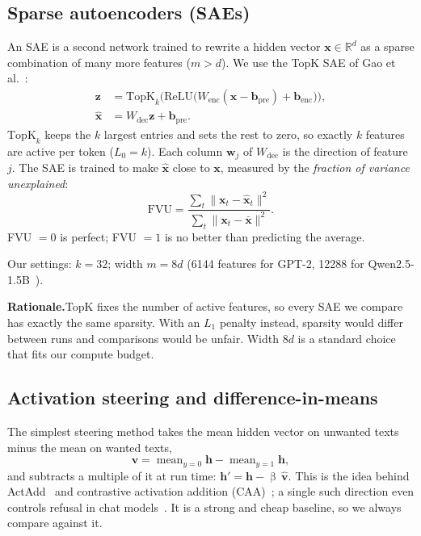 \documentclass[11pt,a4paper]{article}
\theoremstyle{definition}
\newcommand{\avg}{\operatorname{mean}}
\newcommand{\why}[1]{\par\smallskip\noindent\textbf{Rationale.}\enspace #1\par}
\begin{document}
\subsection{Sparse autoencoders (SAEs)}
An SAE is a second network trained to rewrite a hidden vector $\mathbf x\in\mathbb R^{d}$ as a
sparse combination of many more features ($m>d$). We use the TopK SAE of Gao et
al.~\cite{gao2024scaling,makhzani2013ksparse}:
\begin{align}
  \mathbf z&=\mathrm{TopK}_k\!\Big(\mathrm{ReLU}\big(W_{\mathrm{enc}}(\mathbf x-\mathbf b_{\mathrm{pre}})+\mathbf b_{\mathrm{enc}}\big)\Big),\\
  \hat{\mathbf x}&=W_{\mathrm{dec}}\mathbf z+\mathbf b_{\mathrm{pre}}.
\end{align}
$\mathrm{TopK}_k$ keeps the $k$ largest entries and sets the rest to zero, so exactly $k$ features
are active per token ($L_0=k$). Each column $\mathbf w_j$ of $W_{\mathrm{dec}}$ is the direction
of feature $j$. The SAE is trained to make $\hat{\mathbf x}$ close to $\mathbf x$, measured by the
\emph{fraction of variance unexplained}:
\begin{equation}
  \mathrm{FVU}=\frac{\sum_t\|\mathbf x_t-\hat{\mathbf x}_t\|^2}{\sum_t\|\mathbf x_t-\bar{\mathbf x}\|^2}.
\end{equation}
FVU $=0$ is perfect; FVU $=1$ is no better than predicting the average.

Our settings: $k=32$; width $m=8d$ (6144 features for GPT-2, 12288 for Qwen2.5-1.5B~\cite{qwen2024qwen25}).

\why{TopK fixes the number of active features, so every SAE we compare has exactly the same
sparsity. With an $L_1$ penalty instead, sparsity would differ between runs and comparisons would
be unfair. Width $8d$ is a standard choice that fits our compute budget.}

\subsection{Activation steering and difference-in-means}
The simplest steering method takes the mean hidden vector on unwanted texts minus the mean on
wanted texts,
\begin{equation}
  \mathbf v=\avg_{y=0}\mathbf h-\avg_{y=1}\mathbf h,
\end{equation}
and subtracts a multiple of it at run time: $\mathbf h'=\mathbf h-\upbeta\,\hat{\mathbf v}$. This is
the idea behind ActAdd~\cite{turner2023actadd} and contrastive activation addition
(CAA)~\cite{rimsky2024caa}; a single such direction even controls refusal in chat
models~\cite{arditi2024refusal}. It is a strong and cheap baseline, so we always compare against it.
\end{document}
